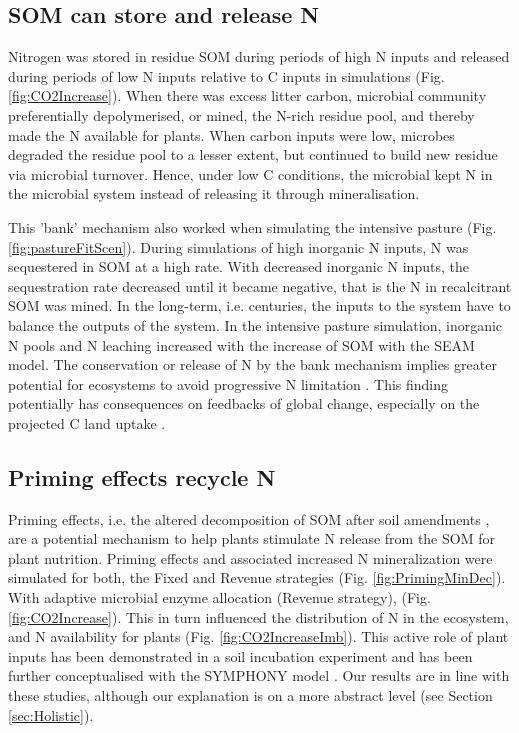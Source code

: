 \subsection{SOM can store and release N}
Nitrogen was stored in residue SOM during periods of high N inputs and
released during periods of low N inputs relative to C inputs in simulations
(Fig.
\ref{fig:CO2Increase}). When there was excess litter carbon, microbial community
preferentially depolymerised, or mined, the N-rich residue pool, and thereby
made the N available for plants. When carbon inputs were low, microbes degraded the
residue pool to a lesser extent, but continued to build new residue via microbial turnover.
Hence, under low C conditions, the microbial kept N in the microbial system instead of releasing it through mineralisation. 

This 'bank' mechanism \citep[sensu][]{Perveen14} also worked when simulating the
intensive pasture (Fig. \ref{fig:pastureFitScen}). During simulations of high
inorganic N inputs, N was sequestered in SOM at a high rate. With decreased
inorganic N inputs, the sequestration rate decreased until it became negative,
that is the N in recalcitrant SOM was mined. In the long-term, i.e. centuries,
the inputs to the system have to balance the outputs of the system. In the
intensive pasture simulation, inorganic N pools and N leaching increased with
the increase of SOM with the SEAM model. The conservation or release of N by the
bank mechanism implies greater potential for ecosystems to avoid progressive N
limitation \citep{Norby10, Franklin14, Averill15}. This finding
potentially has consequences on feedbacks of global change, especially on the
projected C land uptake \citep{Friedlingstein14}.

\subsection{Priming effects recycle N}
Priming effects, i.e. the altered decomposition of SOM after soil amendments
\citep{Kuzyakov00}, are a potential mechanism to help plants stimulate N release
from the SOM for plant nutrition.
Priming effects and associated increased N mineralization were simulated for
both, the Fixed and Revenue strategies (Fig. \ref{fig:PrimingMinDec}). With
adaptive microbial enzyme allocation (Revenue strategy),  (Fig.
\ref{fig:CO2Increase}).
This in turn influenced the distribution of N in the ecosystem, and N
availability for plants (Fig.
\ref{fig:CO2IncreaseImb}). This active role of plant inputs has been
demonstrated in a soil incubation experiment \citep{Fontaine11} and has been
further conceptualised with the SYMPHONY model \citep{Perveen14}. Our results
are in line with these studies, although our explanation is on a more abstract
level (see Section \ref{sec:Holistic}). 

